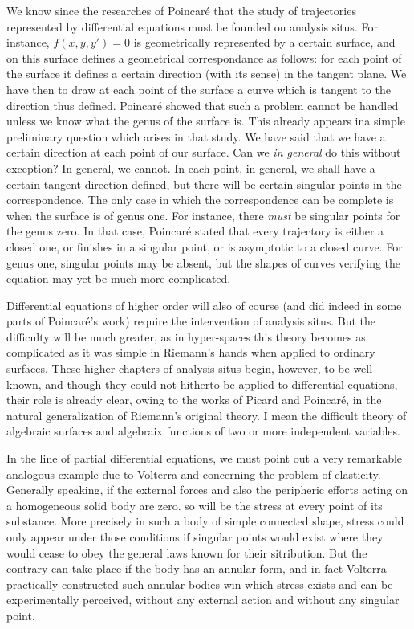 \documentclass[12pt,oneside]{book}
\begin{document}
We know since the researches of Poincar\'e that the study of trajectories represented by differential equations must be founded on analysis situs. For instance, $f(x,y,y')=0$ is geometrically represented by a certain surface, and on this surface defines a geometrical correspondance as follows: for each point of the surface it defines a certain direction (with its sense) in the tangent plane. We have then to draw at each point of the surface a curve which is tangent to the direction thus defined. Poincar\'e showed that such a problem cannot be handled unless we know what the genus of the surface is. This already appears ina simple preliminary question which arises in that study. We have said that we have a certain direction at each point of our surface. Can we \textit{in general} do this without exception? In general, we cannot. In each point, in general, we shall have a certain tangent direction defined, but there will be certain singular points in the correspondence. The only case in which the correspondence can be complete is when the surface is of genus one. For instance, there \textit{must} be singular points for the genus zero. In that case, Poincar\'e stated that every trajectory is either a closed one, or finishes in a singular point, or is asymptotic to a closed curve. For genus one, singular points may be absent, but the shapes of curves verifying the equation may yet be much more complicated. \par

Differential equations of higher order will also of course (and did indeed in some parts of Poincar\'e's work) require the intervention of analysis situs. But the difficulty will be much greater, as in hyper-spaces this theory becomes as complicated as it was simple in Riemann's hands when applied to ordinary surfaces. These higher chapters of analysis situs begin, however, to be well known, and though they could not hitherto be applied to differential equations, their role is already clear, owing to the works of Picard and Poincar\'e, in the natural generalization of Riemann's original theory. I mean the difficult theory of algebraic surfaces and algebraix functions of two or more independent variables. \par

In the line of partial differential equations, we must point out a very remarkable analogous example due to Volterra and concerning the problem of elasticity. Generally speaking, if the external forces and also the peripheric efforts acting on a homogeneous solid body are zero. so will be the stress at every point of its substance. More precisely in such a body of simple connected shape, stress could only appear under those conditions if singular points would exist where they would cease to obey the general laws known for their sitribution. But the contrary can take place if the body has an annular form, and in fact Volterra practically constructed such annular bodies win which stress exists and can be experimentally perceived, without any external action and without any singular point. \par
\end{document}
